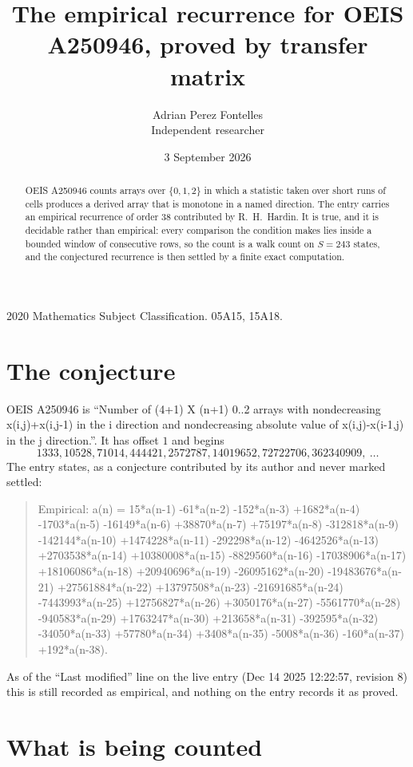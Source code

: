 \documentclass[11pt,a4paper]{article}
\title{The empirical recurrence for OEIS A250946, proved by transfer matrix}
\author{Adrian Perez Fontelles\\ \small Independent researcher}
\date{3 September 2026}
\theoremstyle{plain}
\theoremstyle{definition}
\begin{document}
\maketitle

\begin{abstract}
OEIS A250946 counts arrays over $\{0,1,2\}$ in which a statistic taken over short runs
of cells produces a derived array that is monotone in a named direction. The entry carries an
empirical recurrence of order $38$ contributed by R.~H.~Hardin. It is true, and it is
decidable rather than empirical: every comparison the condition makes lies inside a bounded
window of consecutive rows, so the count is a walk count on $S=243$ states, and the
conjectured recurrence is then settled by a finite exact computation.
\end{abstract}

\noindent\small 2020 Mathematics Subject Classification. 05A15, 15A18.\normalsize

\section{The conjecture}

OEIS A250946 is ``Number of (4+1) X (n+1) 0..2 arrays with nondecreasing x(i,j)+x(i,j-1) in the i direction and nondecreasing absolute value of x(i,j)-x(i-1,j) in the j direction.''. It has offset $1$ and begins
\[
1333, 10528, 71014, 444421, 2572787, 14019652, 72722706, 362340909,\ \dots
\]
The entry states, as a conjecture contributed by its author and never marked settled:
\begin{quote}
Empirical: a(n) = 15*a(n-1) -61*a(n-2) -152*a(n-3) +1682*a(n-4) -1703*a(n-5) -16149*a(n-6) +38870*a(n-7) +75197*a(n-8) -312818*a(n-9) -142144*a(n-10) +1474228*a(n-11) -292298*a(n-12) -4642526*a(n-13) +2703538*a(n-14) +10380008*a(n-15) -8829560*a(n-16) -17038906*a(n-17) +18106086*a(n-18) +20940696*a(n-19) -26095162*a(n-20) -19483676*a(n-21) +27561884*a(n-22) +13797508*a(n-23) -21691685*a(n-24) -7443993*a(n-25) +12756827*a(n-26) +3050176*a(n-27) -5561770*a(n-28) -940583*a(n-29) +1763247*a(n-30) +213658*a(n-31) -392595*a(n-32) -34050*a(n-33) +57780*a(n-34) +3408*a(n-35) -5008*a(n-36) -160*a(n-37) +192*a(n-38).
\end{quote}
As of the ``Last modified'' line on the live entry (Dec 14 2025 12:22:57, revision 8) this is still
recorded as empirical, and nothing on the entry records it as proved.

\section{What is being counted}
\end{document}
